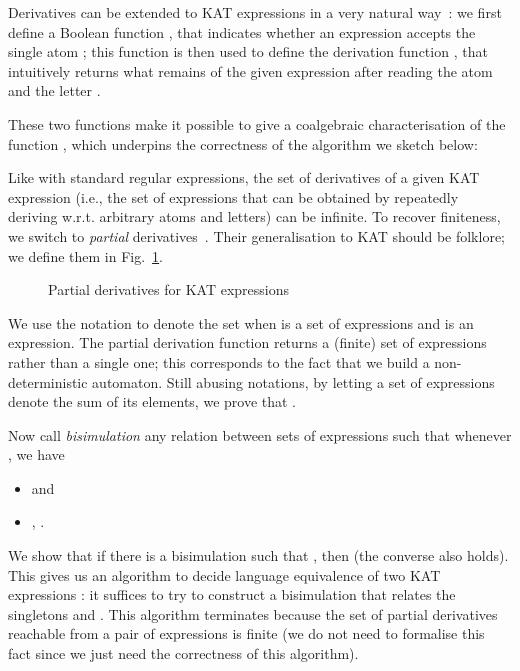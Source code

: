 \documentclass[a4paper]{llncs}
\newif\iflong\longfalse
\begin{document}
Derivatives can be extended to KAT expressions in a very natural
way~\cite{kozen08:kat:coalgebra}: we first define a Boolean function
, that indicates whether an expression accepts the
single atom ; this function is then used to define the
derivation function , that intuitively returns what
remains of the given expression after reading the atom  and
the letter . 
\iflong
\begin{figure}[t]
  \centering
  
  \vspace{-1em}
  \caption{Derivatives for KAT expressions}
\label{fig:kat:deriv}
\end{figure}
\fi
These two functions make it possible to give a coalgebraic
characterisation of the function , which underpins the
correctness of the algorithm we sketch below:


Like with standard regular expressions, the set of derivatives of a
given KAT expression (i.e., the set of expressions that can be
obtained by repeatedly deriving w.r.t. arbitrary atoms and letters)
can be infinite. To recover finiteness, we switch to \emph{partial}
derivatives~\cite{Antimirov96}. Their generalisation to KAT should be
folklore; we define them in Fig.~\ref{fig:kat:pderiv}.
\begin{figure}[t]
  \centering
  
  \vspace{-1em}
  \caption{Partial derivatives for KAT expressions}
\label{fig:kat:pderiv}
\end{figure}
We use the notation  to denote the set  when
 is a set of expressions and  is an expression. The partial
derivation function  returns a (finite) set of
expressions rather than a single one; this corresponds to the fact
that we build a non-deterministic automaton. Still abusing notations,
by letting a set of expressions denote the sum of its elements,
we prove that .

\medskip

Now call \emph{bisimulation} any relation  between sets of
expressions such that whenever , we have
\begin{itemize}
\item  and
\item ,
  .
\end{itemize}
We show that if there is a bisimulation  such that , then  (the converse also holds).  This gives us an
algorithm to decide language equivalence of two KAT expressions :
it suffices to try to construct a bisimulation that relates the
singletons  and . This algorithm terminates because the set of partial derivatives
reachable from a pair of expressions is finite (we do not need to
formalise this fact since we just need the correctness of this
algorithm).
\end{document}
